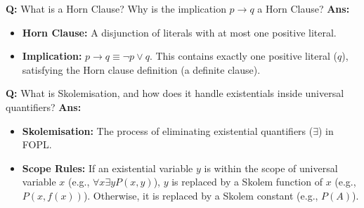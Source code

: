 \documentclass[10pt,a4paper,twocolumn]{article}
\begin{document}
\begin{tcolorbox}[
  colback=white,
  colframe=UnitColorEight,
  colbacktitle=gray!10!white,
  coltitle=black,
  fonttitle=\bfseries\sffamily\small,
  title={Unit VIII $\bullet$ Card 2: Definite Horn Clause},
  boxrule=1.2pt,
  arc=2mm,
  outer arc=2mm,
  boxsep=1.5mm,
  top=1mm,
  bottom=1mm,
  left=1.5mm,
  right=1.5mm,
  before skip=2.5mm,
  after skip=2.5mm
]
\textbf{Q:} What is a Horn Clause? Why is the implication $p \rightarrow q$ a Horn Clause?
\tcbline
\textbf{Ans:} \begin{itemize}
  \item   \textbf{Horn Clause:} A disjunction of literals with at most one positive literal.
  \item   \textbf{Implication:} $p \rightarrow q \equiv \neg p \lor q$. This contains exactly one positive literal ($q$), satisfying the Horn clause definition (a definite clause).
\end{itemize}
\end{tcolorbox}


\begin{tcolorbox}[
  colback=white,
  colframe=UnitColorEight,
  colbacktitle=gray!10!white,
  coltitle=black,
  fonttitle=\bfseries\sffamily\small,
  title={Unit VIII $\bullet$ Card 3: Skolemisation},
  boxrule=1.2pt,
  arc=2mm,
  outer arc=2mm,
  boxsep=1.5mm,
  top=1mm,
  bottom=1mm,
  left=1.5mm,
  right=1.5mm,
  before skip=2.5mm,
  after skip=2.5mm
]
\textbf{Q:} What is Skolemisation, and how does it handle existentials inside universal quantifiers?
\tcbline
\textbf{Ans:} \begin{itemize}
  \item   \textbf{Skolemisation:} The process of eliminating existential quantifiers ($\exists$) in FOPL.
  \item   \textbf{Scope Rules:} If an existential variable $y$ is within the scope of universal variable $x$ (e.g., $\forall x \exists y P(x, y)$), $y$ is replaced by a Skolem function of $x$ (e.g., $P(x, f(x))$). Otherwise, it is replaced by a Skolem constant (e.g., $P(A)$).
\end{itemize}
\end{tcolorbox}
\end{document}
